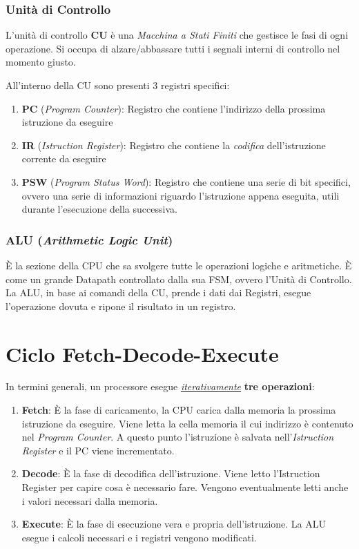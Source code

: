 \documentclass[12pt,oneside]{book}
\begin{document}
\subsubsection{Unità di Controllo}
L'unità di controllo \textbf{CU} è una \emph{Macchina a Stati Finiti} che gestisce le fasi di ogni operazione. Si occupa di alzare/abbassare tutti i segnali interni di controllo
nel momento giusto.

All'interno della CU sono presenti 3 registri specifici:
\begin{enumerate}
    \item \textbf{PC} (\emph{Program Counter}): Registro che contiene l'indirizzo della prossima istruzione da eseguire
    \item \textbf{IR} (\emph{Istruction Register}): Registro che contiene la \emph{codifica} dell'istruzione corrente da eseguire
    \item \textbf{PSW} (\emph{Program Status Word}): Registro che contiene una serie di bit specifici, ovvero una serie di informazioni riguardo l'istruzione appena
          eseguita, utili durante l'esecuzione della successiva.
\end{enumerate}

\subsubsection{ALU (\emph{Arithmetic Logic Unit})}
È la sezione della CPU che sa svolgere tutte le operazioni logiche e aritmetiche. È come un grande Datapath controllato dalla sua FSM, ovvero l'Unità di Controllo.
La ALU, in base ai comandi della CU, prende i dati dai Registri, esegue l'operazione dovuta e ripone il risultato in un registro.

\section{Ciclo Fetch-Decode-Execute}
In termini generali, un processore esegue \underline{\emph{iterativamente}} \textbf{tre operazioni}:
\begin{enumerate}
    \item \textbf{Fetch}: È la fase di caricamento, la CPU carica dalla memoria la prossima istruzione da eseguire.
          Viene letta la cella memoria il cui indirizzo è contenuto nel \emph{Program Counter}. A questo punto l'istruzione è salvata nell'\emph{Istruction Register} e il PC viene incrementato.
    \item \textbf{Decode}: È la fase di decodifica dell'istruzione. Viene letto l'Istruction Register per capire cosa è necessario fare. Vengono eventualmente letti anche i valori necessari dalla memoria.
    \item \textbf{Execute}: È la fase di esecuzione vera e propria dell'istruzione. La ALU esegue i calcoli necessari e i registri vengono modificati.
\end{enumerate}
\end{document}
